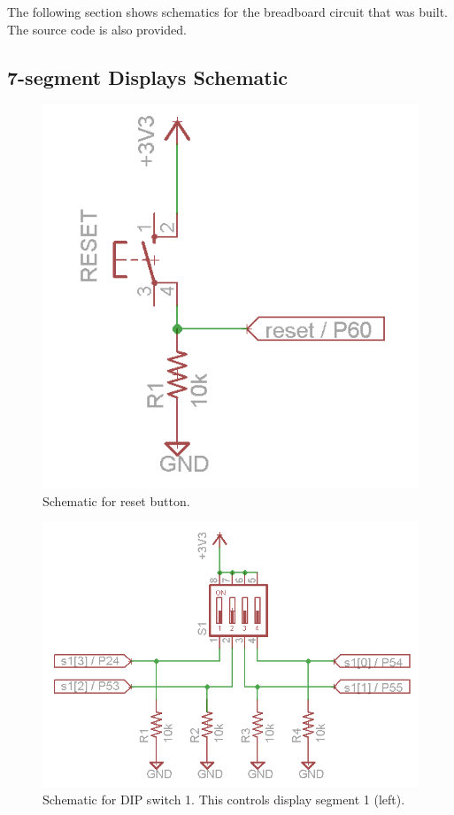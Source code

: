 \documentclass[11pt]{article}
\begin{document}
The following section shows schematics for the breadboard circuit that was built. The source code is also provided.

\subsection{7-segment Displays Schematic}


\begin{figure}[h!]
\centering
\includegraphics[scale=0.54]{reset.png}
\caption{Schematic for reset button.}
\label{fig:reset_sch}
\end{figure} 


\begin{figure}[h!]
\centering
\includegraphics[scale=0.54]{s1.png}
\caption{Schematic for DIP switch 1. This controls display segment 1 (left).}
\label{fig:s1_sch}
\end{figure} 
\end{document}
